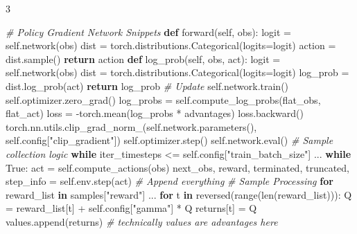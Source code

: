 \documentclass{article}
\newenvironment{Shaded}{\CodeFontSize\setlength{\topsep}{\CodeBlockSkip}\setlength{\partopsep}{0pt}}{}
\newcommand{\BuiltInTok}[1]{\textcolor[rgb]{0.00,0.50,0.00}{#1}}
\newcommand{\CommentTok}[1]{\textcolor[rgb]{0.38,0.63,0.69}{\textit{#1}}}
\newcommand{\ControlFlowTok}[1]{\textcolor[rgb]{0.00,0.44,0.13}{\textbf{#1}}}
\newcommand{\KeywordTok}[1]{\textcolor[rgb]{0.00,0.44,0.13}{\textbf{#1}}}
\newcommand{\NormalTok}[1]{#1}
\newcommand{\OperatorTok}[1]{\textcolor[rgb]{0.40,0.40,0.40}{#1}}
\newcommand{\StringTok}[1]{\textcolor[rgb]{0.25,0.44,0.63}{#1}}
\newcommand{\VariableTok}[1]{\textcolor[rgb]{0.10,0.09,0.49}{#1}}
\newcommand{\CodeFontSize}{\fontsize{4.8}{5.6}\selectfont}
\newcommand{\NumColumns}{3}  %
\newlength{\CodeBlockSkip}
\begin{document}
\begin{multicols*}{\NumColumns}
\begin{Shaded}
\begin{Highlighting}[]
\CommentTok{\# Policy Gradient Network Snippets}
\KeywordTok{def}\NormalTok{ forward(}\VariableTok{self}\NormalTok{, obs):}
\NormalTok{  logit }\OperatorTok{=} \VariableTok{self}\NormalTok{.network(obs)}
\NormalTok{  dist }\OperatorTok{=}\NormalTok{ torch.distributions.Categorical(logits}\OperatorTok{=}\NormalTok{logit)}
\NormalTok{  action }\OperatorTok{=}\NormalTok{ dist.sample()}
  \ControlFlowTok{return}\NormalTok{ action}
\KeywordTok{def}\NormalTok{ log\_prob(}\VariableTok{self}\NormalTok{, obs, act):}
\NormalTok{  logit }\OperatorTok{=} \VariableTok{self}\NormalTok{.network(obs)}
\NormalTok{  dist }\OperatorTok{=}\NormalTok{ torch.distributions.Categorical(logits}\OperatorTok{=}\NormalTok{logit)}
\NormalTok{  log\_prob }\OperatorTok{=}\NormalTok{ dist.log\_prob(act)}
  \ControlFlowTok{return}\NormalTok{ log\_prob}
\CommentTok{\# Update}
\VariableTok{self}\NormalTok{.network.train()}
\VariableTok{self}\NormalTok{.optimizer.zero\_grad()}
\NormalTok{log\_probs }\OperatorTok{=} \VariableTok{self}\NormalTok{.compute\_log\_probs(flat\_obs, flat\_act)}
\NormalTok{loss }\OperatorTok{=} \OperatorTok{{-}}\NormalTok{torch.mean(log\_probs }\OperatorTok{*}\NormalTok{ advantages)}
\NormalTok{loss.backward()}
\NormalTok{torch.nn.utils.clip\_grad\_norm\_(}\VariableTok{self}\NormalTok{.network.parameters(), }\VariableTok{self}\NormalTok{.config[}\StringTok{"clip\_gradient"}\NormalTok{])}
\VariableTok{self}\NormalTok{.optimizer.step()}
\VariableTok{self}\NormalTok{.network.}\BuiltInTok{eval}\NormalTok{()}
\CommentTok{\# Sample collection logic }
\ControlFlowTok{while}\NormalTok{ iter\_timesteps }\OperatorTok{\textless{}=} \VariableTok{self}\NormalTok{.config[}\StringTok{"train\_batch\_size"}\NormalTok{]}
\NormalTok{  ...}
  \ControlFlowTok{while} \VariableTok{True}\NormalTok{:}
\NormalTok{    act }\OperatorTok{=} \VariableTok{self}\NormalTok{.compute\_actions(obs)}
\NormalTok{    next\_obs, reward, terminated, truncated, step\_info }\OperatorTok{=} \VariableTok{self}\NormalTok{.env.step(act)}
    \CommentTok{\# Append everything}
\CommentTok{\# Sample Processing}
\ControlFlowTok{for}\NormalTok{ reward\_list }\KeywordTok{in}\NormalTok{ samples[}\StringTok{"reward"}\NormalTok{]}
\NormalTok{  ...}
  \ControlFlowTok{for}\NormalTok{ t }\KeywordTok{in} \BuiltInTok{reversed}\NormalTok{(}\BuiltInTok{range}\NormalTok{(}\BuiltInTok{len}\NormalTok{(reward\_list))):}
\NormalTok{    Q }\OperatorTok{=}\NormalTok{ reward\_list[t] }\OperatorTok{+} \VariableTok{self}\NormalTok{.config[}\StringTok{"gamma"}\NormalTok{] }\OperatorTok{*}\NormalTok{ Q}
\NormalTok{    returns[t] }\OperatorTok{=}\NormalTok{ Q}
\NormalTok{  values.append(returns) }\CommentTok{\# technically values are advantages here}
\end{Highlighting}
\end{Shaded}


\end{multicols*}
\end{document}
